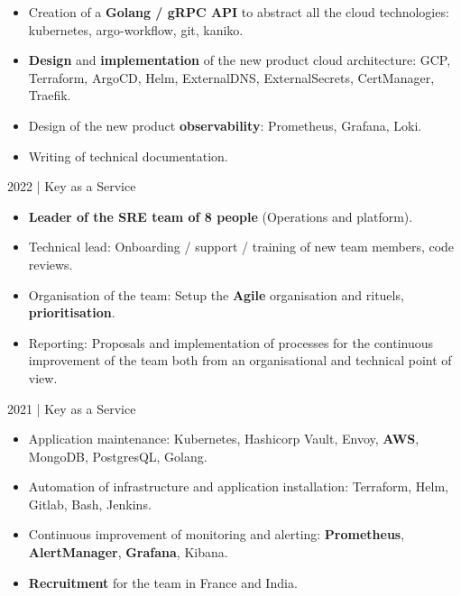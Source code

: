 \documentclass[
	a4paper,
	maincolor=cvartifakt,
	sidecolor=cvgray,
	sidebartextcolor=cvwhite,
	sectioncolor=cvartifakt,
	subsectioncolor=cvgray,
	sidebarwidth=0.36\paperwidth,
    topbottommargin=0.04\paperheight,
]{fortysecondscv}
\makeatletter
\newcommand\thefontsize{\f@size pt}
\makeatother
\begin{document}
\makefrontsidebar{}

\begin{cvtable}[2]
	{
		\begin{itemize}
			\item Creation of a \textbf{Golang / gRPC API} to abstract all the cloud technologies: kubernetes, argo-workflow, git, kaniko.
			\item \textbf{Design} and \textbf{implementation} of the new product cloud architecture: GCP, Terraform, ArgoCD, Helm, ExternalDNS, ExternalSecrets, CertManager, Traefik.
			\item Design of the new product \textbf{observability}: Prometheus, Grafana, Loki.
			\item Writing of technical documentation.
		\end{itemize}
	}
	{
		\textcolor{maincolor}{2022 | Key as a Service}
			\begin{itemize}
				\item \textbf{Leader of the SRE team of 8 people} (Operations and platform).
				\item Technical lead: Onboarding / support / training of new team members, code reviews.
				\item Organisation of the team: Setup the \textbf{Agile} organisation and rituels, \textbf{prioritisation}.
				\item Reporting: Proposals and implementation of processes for the continuous improvement of the team both from an organisational and technical point of view.
			\end{itemize}
			\vspace{8pt}
			\textcolor{maincolor}{2021 | Key as a Service}
			\begin{itemize}
				\item Application maintenance: Kubernetes, Hashicorp Vault, Envoy, \textbf{AWS}, MongoDB, PostgresQL, Golang.
				\item Automation of infrastructure and application installation: Terraform, Helm, Gitlab, Bash, Jenkins.
				\item Continuous improvement of monitoring and alerting: \textbf{Prometheus}, \textbf{AlertManager}, \textbf{Grafana}, Kibana.
				\item \textbf{Recruitment} for the team in France and India.

\end{itemize}}
\end{cvtable}
\end{document}
